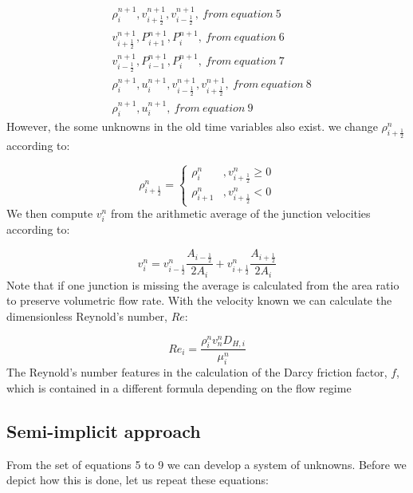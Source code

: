 \documentclass[11pt,letterpaper,titlepage]{article}
\newcommand{\half}{\frac{1}{2}}
\begin{document}
\begin{equation*}
\begin{aligned}
&\rho_i^{n+1}, v_{i+\half}^{n+1}, v_{i-\half}^{n+1}, \ from \ equation \ 5 \\
&v_{i+\half}^{n+1}, P_{i+1}^{n+1},P_{i}^{n+1}, \ from \ equation \ 6 \\
&v_{i-\half}^{n+1}, P_{i-1}^{n+1},P_{i}^{n+1}, \ from \ equation \ 7 \\
&\rho_i^{n+1}, u_{i}^{n+1}, v_{i-\half}^{n+1},v_{i+\half}^{n+1}, \ from \ equation \ 8 \\
&\rho_i^{n+1}, u_{i}^{n+1}, \ from \ equation \ 9
\end{aligned}
\end{equation*}
\newline
However, the some unknowns in the old time variables also exist. we change $\rho_{i+\half}^{n}$ according to:

\begin{equation*}
\rho_{i+\half}^{n}=
\begin{cases}
\rho_{i}^{n}       &, v_{i+\half}^n\ge 0 \\
\rho_{i+1}^{n}     &, v_{i+\half}^n<0
\end{cases}
\end{equation*}
\newline
We then compute $v_i^{n}$ from the arithmetic average of the junction velocities according to:

\begin{equation*}
v_i^{n}=v_{i-\half}^n \frac{A_{i-\half}}{2A_i} + v_{i+\half}^n \frac{A_{i+\half}}{2A_i}
\end{equation*}
\newline
Note that if one junction is missing the average is calculated from the area ratio to preserve volumetric flow rate. With the velocity known we can calculate the dimensionless Reynold's number, $Re$:

\begin{equation*}
Re_i=\frac{\rho_i^n v_n^n D_{H,i}}{\mu_i^n}
\end{equation*}
\newline
The Reynold's number features in the calculation of the Darcy friction factor, $f$, which is contained in a different formula depending on the flow regime




\newpage
\subsection{Semi-implicit approach}
From the set of equations 5 to 9 we can develop a system of unknowns. Before we depict how this is done, let us repeat these equations:
\end{document}
